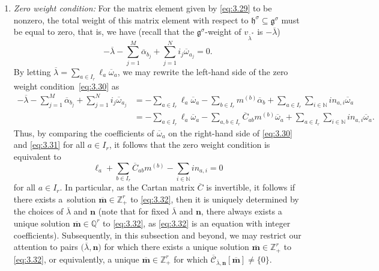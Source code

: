 \documentclass[10pt,a4paper]{amsart}
\numberwithin{equation}{section}
\begin{document}
\begin{enumerate}\itemsep=0pt
\item[$(1)$] \emph{Zero weight condition:} For the matrix element given by \eqref{eq:3.29} to be nonzero, the total weight of this matrix element with respect to $\mathfrak{h}^{\sigma} \subseteq\mathfrak{g}^{\sigma}$ must be equal to zero, that is, we have (recall that the $\mathfrak{g}^{\sigma}$-weight of $v_{\overline{\lambda}^*}$ is $-\overline{\lambda}$)
\begin{equation}\label{eq:3.30}
-\overline{\lambda}-\sum_{j=1}^M\overline{\alpha}_{b_j}+ \sum_{j=1}^Ni_j\overline{\omega}_{a_j}=0.
\end{equation}
By letting $\overline{\lambda}=\sum_{a\in I_r}\ell_a \overline{\omega}_a$, we may rewrite the left-hand side of the zero weight condition~\eqref{eq:3.30} as
\begin{align}
-\overline{\lambda}-\sum_{j=1}^M\overline{\alpha}_{b_j}+ \sum_{j=1}^Ni_j\overline{\omega}_{a_j}
&=-\sum_{a\in I_r}\ell_a\overline{\omega}_a-\sum_{b\in I_r}m^{(b)} \overline{\alpha}_b+\sum_{a\in I_r}\sum_{i\in\mathbb{N}} in_{a,i}\overline{\omega}_a\nonumber\\
&=-\sum_{a\in I_r}\ell_a\overline{\omega}_a-\sum_{a,b\in I_r}\overline{C}_{ab} m^{(b)}\overline{\omega}_a+\sum_{a\in I_r}\sum_{i\in \mathbb{N}}in_{a,i}\overline{\omega}_a.\label{eq:3.31}
\end{align}
Thus, by comparing the coefficients of $\overline{\omega}_a$ on the right-hand side of \eqref{eq:3.30} and \eqref{eq:3.31} for all $a\in I_r$, it follows that the zero weight condition is equivalent to
\begin{equation}\label{eq:3.32}
\ell_a+\sum_{b\in I_r}\overline{C}_{ab} m^{(b)}-\sum_{i\in \mathbb{N}}in_{a,i}=0
\end{equation}
for all $a\in I_r$. In particular, as the Cartan matrix $\overline{C}$ is invertible, it follows if there exists a~solution $\overline{\mathbf{m}}\in\mathbb{Z}_+^r$ to \eqref{eq:3.32}, then it is uniquely determined by the choices of $\overline{\lambda}$ and $\mathbf{n}$ (note that for fixed $\overline{\lambda}$ and $\mathbf{n}$, there always exists a unique solution $\overline{\mathbf{m}}\in\mathbb{Q}^r$ to \eqref{eq:3.32}, as \eqref{eq:3.32} is an equation with integer coefficients). Subsequently, in this subsection and beyond, we may restrict our attention to pairs $\bigl(\overline{\lambda},\mathbf{n}\bigr)$ for which there exists a unique solution $\overline{\mathbf{m}}\in\mathbb{Z}_+^r$ to \eqref{eq:3.32}, or equivalently, a unique $\overline{ \mathbf{m}}\in\mathbb{Z}_+^r$ for which $\overline{ \mathcal{C}}_{\overline{\lambda},\mathbf{n}}[\overline{ \mathbf{m}}]\neq\{0\}$.


\end{enumerate}
\end{document}
